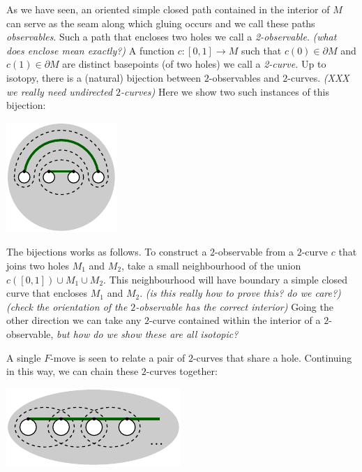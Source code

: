 \documentclass[aps, prl, letterpaper, twocolumn, superscriptaddress, notitlepage, 10pt]{revtex4-1}
\begin{document}
As we have seen, an oriented simple closed path 
contained in the interior of $M$ can serve as
the seam along which gluing occurs and we call
these paths \emph{observables}.
Such a path that encloses two holes
we call a \emph{2-observable}.
\emph{(what does enclose mean exactly?)}
A function $c:[0,1]\to M$ such that 
$c(0)\in \partial M$ and $c(1)\in \partial M$
are distinct basepoints (of two holes)
we call a \emph{2-curve.}
Up to isotopy, %
there is a (natural) bijection between
$2$-observables and $2$-curves.
\emph{(XXX we really need undirected $2$-curves)}
Here we show two such instances of this
bijection:
\begin{center}
\includegraphics[]{pic-2-curve.pdf}
\end{center}
The bijections works as follows.
To construct a $2$-observable from a $2$-curve $c$ that
joins two holes $M_1$ and $M_2$,
take a small neighbourhood of
the union $c([0,1])\cup M_1 \cup M_2.$
This neighbourhood will have boundary a simple closed
curve that encloses $M_1$ and $M_2.$
\emph{(is this really how to prove this? do we care?)}
\emph{(check the orientation of the $2$-observable has the correct interior)}
Going the other direction we can take
any $2$-curve contained within the interior of a $2$-observable,
\emph{but how do we show these are all isotopic?}



A single $F$-move is seen to relate a pair of $2$-curves
that share a hole.
Continuing in this way, we can chain these $2$-curves together:
\begin{center}
\includegraphics[]{pic-chain.pdf}
\end{center}
\end{document}
